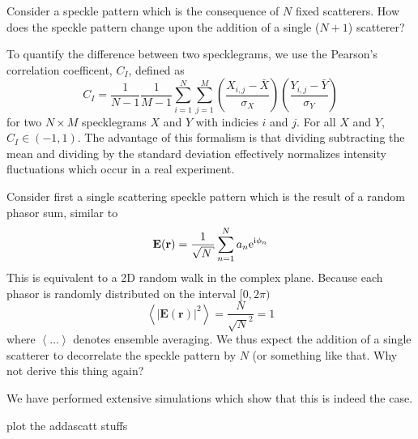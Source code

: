 Consider a speckle pattern which is the consequence of $N$ fixed
scatterers.  How does the speckle pattern change upon the addition of a
single ($N+1$) scatterer?  



To quantify the difference between two specklegrams, we use the Pearson's
correlation coefficent, $C_I$, defined as 
\begin{equation}
C_I = \frac{1}{N-1} \frac{1}{M-1} 
\sum_{i=1}^N \sum_{j=1}^M 
\left(\frac{X_{i,j} - \bar{X}}{\sigma_X}\right)
\left(\frac{Y_{i,j} - \bar{Y}}{\sigma_Y}\right)
\end{equation}
for two $N \times M$ specklegrams $X$ and $Y$ with indicies $i$ and $j$.
For all $X$ and $Y$, $C_I \in (-1,1)$.
The advantage of this formalism is that dividing subtracting the mean and
dividing by the standard deviation effectively normalizes intensity
fluctuations which occur in a real experiment.

Consider first a single scattering speckle pattern which is the result of a
random phasor sum, similar to 
\begin{equation}
\mathbf{E}(\mathbf{r}) = \frac{1}{\sqrt{N}} \sum_{n=1}^{N} a_n \me^{\mi \phi_n}
\end{equation}
This is equivalent to a 2D random walk in the complex plane.  Because each
phasor is randomly distributed on the interval $[0,2\pi)$
\begin{equation}
\left<|\mathbf{E}(\mathbf{r})|^2\right> = \frac{N}{\sqrt{N}^2} = 1
\end{equation}
where $\left<\ldots\right>$ denotes ensemble averaging.  We thus expect the
addition of a single scatterer to decorrelate the speckle pattern by $N$
(or something like that.  Why not derive this thing again?

We have performed extensive simulations which show that this is indeed the
case.

plot the addascatt stuffs

